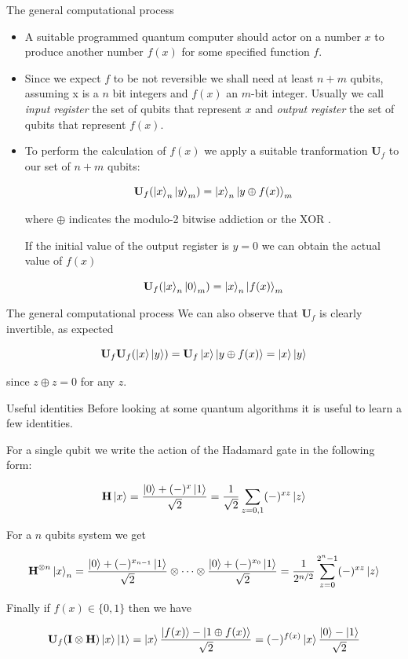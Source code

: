 \documentclass[11p,aspectratio=169]{beamer}
\begin{document}
\begin{frame}{The general computational process}
    \begin{itemize}
        \item A suitable programmed quantum computer should actor on a number $x$ to produce another number
        $f(x)$ for some specified function $f$.
        \item Since we expect $f$ to be not reversible we shall need at least $n+m$ qubits, assuming x is a
        $n$ bit integers and $f(x)$ an $m$-bit integer. Usually we call \emph{input register} the set of qubits
        that represent $x$ and \emph{output register} the set of qubits that represent $f(x)$.
        \item To perform the calculation of $f(x)$ we apply a suitable tranformation $\textbf{U}_f$ to our set of
        $n+m$ qubits:

        $$ \textbf{U}_f (\ket{x}_n \ket{y}_m) = \ket{x}_n \ket{y \oplus f(x)}_m  $$

        where $\oplus$ indicates the modulo-2 bitwise addiction or the XOR .

        If the initial value of the output register is $y=0$ we can obtain the actual value of $f(x)$

        $$ \textbf{U}_f (\ket{x}_n \ket{0}_m) = \ket{x}_n \ket{f(x)}_m  $$

    \end{itemize}

\end{frame}

\begin{frame}{The general computational process}
    We can also observe that $\textbf{U}_f$ is clearly invertible, as expected

    $$ \textbf{U}_f \textbf{U}_f (\ket{x} \ket{y}) = \textbf{U}_f \ket{x} \ket{y \oplus f(x)}
    = \ket{x} \ket{y} $$

    since $z \oplus z = 0$ for any $z$.


\end{frame}

\begin{frame}{Useful identities}
    Before looking at some quantum algorithms it is useful to learn a few identities.

    For a single qubit we write the action of the Hadamard gate in the following form:

    $$\textbf{H} \ket{x} = \frac{\ket{0}+ (-)^x \ket{1}}{\sqrt{2}} = 
    \frac{1}{\sqrt{2}} \sum_{z=0,1} (-)^{xz} \ket{z} $$

    For a $n$ qubits system we get

    $$ \textbf{H}^{\otimes n} \ket{x}_n = 
    \frac{\ket{0}+ (-)^{x_{n-1}} \ket{1}}{\sqrt{2}} \otimes \cdots \otimes 
     \frac{\ket{0}+ (-)^{x_0} \ket{1}}{\sqrt{2}} =
     \frac{1}{2^{n/2}} \sum_{z=0}^{2^n - 1} (-)^{xz} \ket{z}
      $$

    Finally if $f(x) \in \{ 0, 1 \}$ then we have

    $$ \textbf{U}_f (\textbf{I} \otimes \textbf{H})  \ket{x}\ket{1} 
    = \ket{x} \frac{\ket{f(x)} - \ket{1 \oplus f(x)}}{\sqrt{2}} = (-)^{f(x)} \ket{x} \frac{\ket{0} - \ket{1}}{\sqrt{2}}
    $$
\end{frame}
\end{document}
